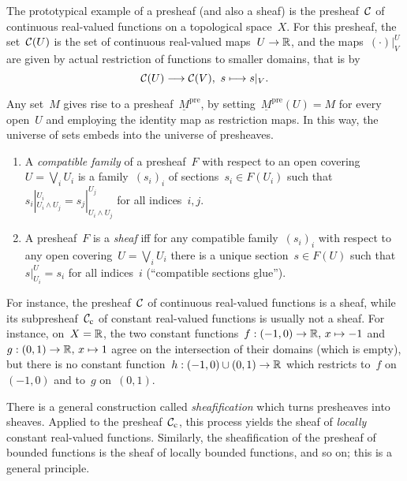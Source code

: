 \documentclass{ws-rv9x6}
\begin{document}
{The prototypical example of a presheaf (and also a sheaf) is the presheaf~$\mathcal{C}$ of
continuous real-valued functions on a topological space~$X$. For this presheaf, the
set~$\mathcal{C}(U)$ is the set of continuous real-valued maps~$U \to \mathbb{R}$, and the
maps~$(\cdot)|^U_V$ are given by actual restriction of functions to smaller
domains, that is by
\[ \mathcal{C}(U) \longrightarrow \mathcal{C}(V),\ s \longmapsto s|_V. \]

Any set~$M$ gives rise to a presheaf~$\underline{M}^\mathrm{pre}$, by
setting~$\underline{M}^\mathrm{pre}(U) = M$ for every open~$U$ and employing
the identity map as restriction maps. In this way, the universe of sets embeds
into the universe of presheaves.

\begin{definition}
\begin{enumerate}
\item A \emph{compatible family} of a presheaf~$F$ with respect to an open
covering~$U = \bigvee_i U_i$ is a family~$(s_i)_i$ of sections~$s_i \in F(U_i)$
such that~$s_i|^{U_i}_{U_i \wedge U_j} = s_j|^{U_j}_{U_i \wedge U_j}$ for all
indices~$i,j$.
\item A presheaf~$F$ is a \emph{sheaf}
iff for any compatible family~$(s_i)_i$ with respect to any open covering~$U =
\bigvee_i U_i$ there is a unique section~$s \in F(U)$ such
that~$s|^U_{U_i} = s_i$ for all indices~$i$ (``compatible sections glue'').
\end{enumerate}
\end{definition}

For instance, the presheaf~$\mathcal{C}$ of continuous real-valued functions is a sheaf,
while its subpresheaf~$\mathcal{C}_\text{c}$ of constant real-valued functions is
usually not a sheaf. For instance, on~$X = \mathbb{R}$, the two constant functions~$f
: (-1,0) \to \mathbb{R},\,x \mapsto -1$ and~$g : (0,1) \to \mathbb{R},\,x \mapsto 1$ agree on
the intersection of their domains (which is empty), but there is no constant
function~$h : (-1,0) \cup (0,1) \to \mathbb{R}$ which restricts to~$f$ on~$(-1,0)$ and
to~$g$ on~$(0,1)$.

There is a general construction called \emph{sheafification} which turns
presheaves into sheaves. Applied to the presheaf~$\mathcal{C}_\text{c}$, this process yields the
sheaf of \emph{locally} constant real-valued functions. Similarly, the
sheafification of the presheaf of bounded functions is the sheaf of locally
bounded functions, and so on; this is a general principle.

}
\end{document}
